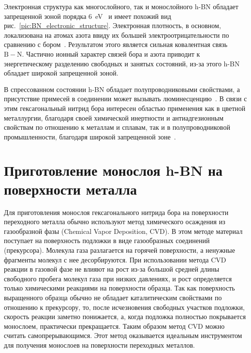 Электронная структура как многослойного, так и монослойного h-BN обладает
запрещенной зоной порядка 6~\si{\eV}~\cite{Ooi2006} и имеет похожий вид
рис.~\ref{pic:BN_electronic_structure}. Электронная плотность, в основном,
локализована на атомах азота ввиду их большей электроотрицательности по сравнению с бором~\cite{Grad2003,Catellani1987}. Результатом этого является
сильная ковалентная связь $\mathrm{B-N}$. 
Частично ионный характер связей бора и азота приводит к энергетическому 
разделению свободных и занятых состояний, из-за этого h-BN обладает широкой
запрещенной зоной. 


В спрессованном состоянии h-BN обладает 
полупроводниковыми свойствами, а присутствие примесей в соединении 
может вызывать люминесценцию~\cite{Museur2008}. В связи с этим гексагональный нитрид 
бора интересен областью применения как в цветной металлургии, 
благодаря своей химической инертности и антиадгезионным свойствам по 
отношению к металлам и сплавам, так и в полупроводниковой 
промышленности, благодаря широкой запрещенной зоне~\cite{
Serzhantova2011}.

\section{Приготовление монослоя h-BN на поверхности металла}

Для приготовления монослоя гексагонального нитрида бора на поверхности
переходного
металла обычно используют метод химического осаждения из газообразной фазы
(Chemical Vapor Deposition, CVD). В этом методе материал поступает на 
поверхность подложки в виде газообразных соединений (прекурсора). Молекула 
газа разлагается на горячей поверхности, а ненужные фрагменты молекул
с нее десорбируются. При использовании метода CVD реакции в газовой фазе не 
влияют на рост из-за большой средней длины свободного пробега молекул газа 
при низких давлениях, и рост определяется только химическими реакциями на
поверхности образца. Так как поверхность выращенного образца обычно не
обладает каталитическим свойствами по отношению к прекурсору, то, после
исчезновения свободных участков подложки, скорость реакции заметно 
понижается, а, когда подложка полностью покрывается монослоем, практически
прекращается. Таким образом метод CVD можно считать самопрерывающимся. Этот
метод оказывается идеальным инструментом для получения монослоев на 
поверхности переходных металлов.


